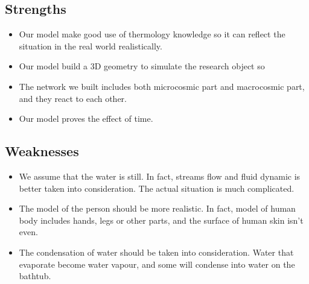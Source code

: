 \documentclass[12pt,a4paper,titlepage]{article}
\begin{document}
\subsection*{Strengths}
\label{sec:strengths}

\begin{itemize}
\item Our model make good use of thermology knowledge so it can reflect the situation in the real world realistically.
\item Our model build a 3D geometry to simulate the research object so
\item The network we built includes both microcosmic part and
  macrocosmic part, and they react to each other.
\item Our model proves the effect of time.
\end{itemize}

\subsection*{Weaknesses}
\label{sec:weaknesses}

\begin{itemize}
\item We assume that the water is still. In fact, streams flow and fluid dynamic is better taken into consideration. The actual situation is much complicated.
\item The model of the person should be more realistic. In fact, model of human body includes hands, legs or other parts, and the surface of human skin isn't even.
\item The condensation of water should be taken into consideration. Water that evaporate become water vapour, and some will condense into water on the bathtub.
\end{itemize}
\end{document}
